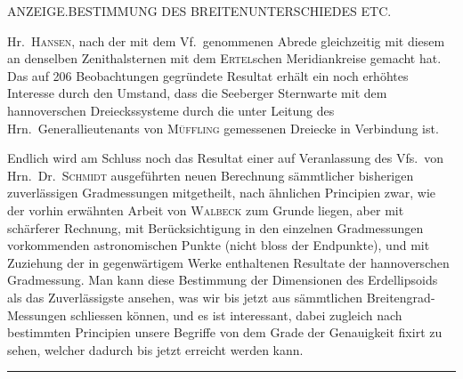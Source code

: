 \clearpage
\noindent{}\parbox{\dimexpr\linewidth-4em\relax}{\centering\small ANZEIGE.\quad BESTIMMUNG DES BREITENUNTERSCHIEDES ETC.}\hfill\mbox{}\par
\noindent Hr.\ \textsc{Hansen}, nach der mit dem Vf.\ genommenen Abrede gleichzeitig mit diesem an denselben Zenithalsternen mit dem \textsc{Ertel}schen Meridiankreise gemacht hat. Das auf 206 Beobachtungen gegründete Resultat erhält ein noch erhöhtes Interesse durch den Umstand, dass die Seeberger Sternwarte mit dem hannoverschen Dreieckssysteme durch die unter Leitung des Hrn.\ Generallieutenants von \textsc{Müffling} gemessenen Dreiecke in Verbindung ist.

Endlich wird am Schluss noch das Resultat einer auf Veranlassung des Vfs.\ von Hrn.\ Dr.\ \textsc{Schmidt} ausgeführten neuen Berechnung sämmtlicher bisherigen zuverlässigen Gradmessungen mitgetheilt, nach ähnlichen Principien zwar, wie der vorhin erwähnten Arbeit von \textsc{Walbeck} zum Grunde liegen, aber mit schärferer Rechnung, mit Berücksichtigung  in den einzelnen Gradmessungen vorkommenden astronomischen Punkte (nicht bloss der Endpunkte), und mit Zuziehung der in gegenwärtigem Werke enthaltenen Resultate der hannoverschen Gradmessung. Man kann diese Bestimmung der Dimensionen des Erdellipsoids als das Zuverlässigste ansehen, was wir bis jetzt aus sämmtlichen Breitengrad-Messungen schliessen können, und es ist interessant, dabei zugleich nach bestimmten Principien unsere Begriffe von dem Grade der Genauigkeit fixirt zu sehen, welcher dadurch bis jetzt erreicht werden kann.
\begin{center}\rule{.25\textwidth}{.4pt}\end{center}


